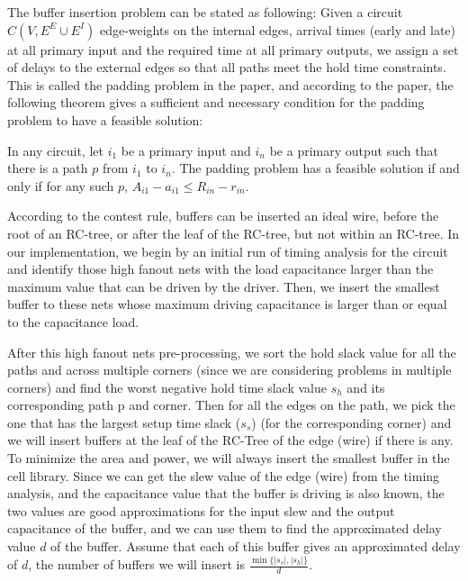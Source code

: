 The buffer insertion problem can be stated as following: Given a circuit $C(V, E^{E} \cup E^{I})$ edge-weights on the internal edges, arrival times (early and late) at all primary input and the required time at all primary outputs, we assign a set of delays to the external edges so that all paths meet the hold time constraints. This is called the padding problem in the paper, and according to the paper, the following theorem gives a sufficient and necessary condition for the padding problem to have a feasible solution:
\begin{theorem}
In any circuit, let $i_1$ be a primary input and $i_n$ be a primary output such that there is a path $p$ from $i_1$ to $i_n$. The padding problem has a feasible solution if and only if for any such $p$, $A_{i1} - a_{i1} \leq R_{in} - r_{in}$.
\end{theorem}

According to the contest rule, buffers can be inserted an ideal wire, before the root of an RC-tree, or after the leaf of the RC-tree, but not within an RC-tree. In our implementation, we begin by an initial run of timing analysis for the circuit and identify those high fanout nets with the load capacitance larger than the maximum value that can be driven by the driver. Then, we insert the smallest buffer to these nets whose maximum driving capacitance is larger than or equal to the capacitance load.

After this high fanout nets pre-processing, we sort the hold slack value for all the paths and across multiple corners (since we are considering problems in multiple corners) and find the worst negative hold time slack value $s_h$ and its corresponding path p and corner. Then for all the edges on the path, we pick the one that has the largest setup time slack ($s_s$) (for the corresponding corner) and we will insert buffers at the leaf of the RC-Tree of the edge (wire) if there is any. To minimize the area and power, we will always insert the smallest buffer in the cell library. Since we can get the slew value of the edge (wire) from the timing analysis, and the capacitance value that the buffer is driving is also known, the two values are good approximations for the input slew and the output capacitance of the buffer, and we can use them to find the approximated delay value $d$ of the buffer. Assume that each of this buffer gives an approximated delay of $d$, the number of buffers we will insert is $\frac{\min\{|s_s|, |s_h|\}}{d}$. 


